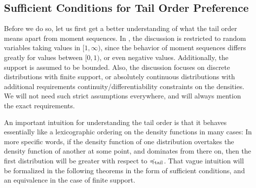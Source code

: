\documentclass[a4paper,DIV=11]{scrreprt}
\theoremstyle{definition}
\begin{document}
    \subsection{Sufficient Conditions for Tail Order Preference}
    Before we do so, let us first get a better understanding of what the tail order means apart from moment sequences.
    In \cite{bib:rassGameRiskManagI}, the discussion is restricted to random variables taking values in $[1, \infty)$, since the behavior of moment sequences differs greatly for values between $[0, 1)$, or even negative values. Additionally, the support is assumed to be bounded. Also, the discussion focuses on discrete distributions with finite support, or absolutely continuous distributions with additional requirements continuity/differentiability constraints on the densities.
    We will not need such strict assumptions everywhere, and will always mention the exact requirements.
    
    An important intuition for understanding the tail order is that it behaves essentially like a lexicographic ordering on the density functions in many cases: In more specific words, if the density function of one distribution overtakes the density function of another at some point, and dominates from there on, then the first distribution will be greater with respect to $\preccurlyeq_{\text{tail}}$.
    That vague intuition will be formalized in the following theorems in the form of sufficient conditions, and an equivalence in the case of finite support.
    
\end{document}
